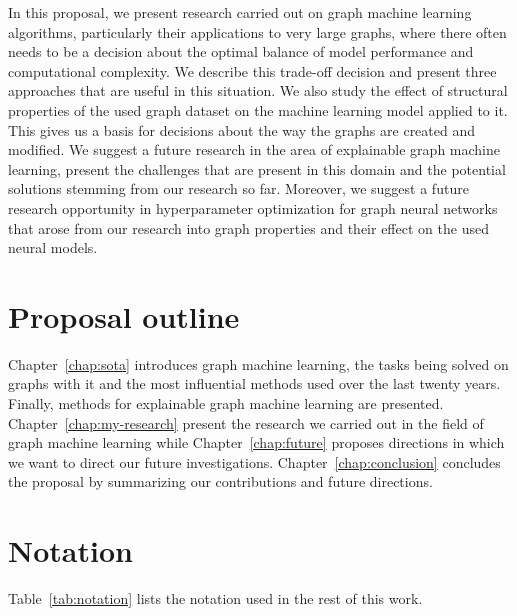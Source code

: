 In this proposal, we present research carried out on graph machine learning algorithms, particularly their applications to very large graphs, where there often needs to be a decision about the optimal balance of model performance and computational complexity. We describe this trade-off decision and present three approaches that are useful in this situation. We also study the effect of structural properties of the used graph dataset on the machine learning model applied to it. This gives us a basis for decisions about the way the graphs are created and modified. We suggest a future research in the area of explainable graph machine learning, present the challenges that are present in this domain and the potential solutions stemming from our research so far. Moreover, we suggest a future research opportunity in hyperparameter optimization for graph neural networks that arose from our research into graph properties and their effect on the used neural models.

\section{Proposal outline}

Chapter~\ref{chap:sota} introduces graph machine learning, the tasks being solved on graphs with it and the most influential methods used over the last twenty years. Finally, methods for explainable graph machine learning are presented. Chapter~\ref{chap:my-research} present the research we carried out in the field of graph machine learning while Chapter~\ref{chap:future} proposes directions in which we want to direct our future investigations. Chapter~\ref{chap:conclusion} concludes the proposal by summarizing our contributions and future directions.

\section{Notation}

Table~\ref{tab:notation} lists the notation used in the rest of this work.

